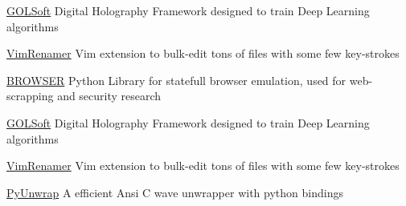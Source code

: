 \documentclass[11pt,a4paper]{moderncv}
\begin{document}

    \cventry{}                                                                         %
        {\href{https://github.com/pointtonull/golsoft}{GOLSoft}}                       %
        {Digital Holography Framework designed                                         %
         to train Deep Learning algorithms}                                            %
        {}{}{}                                                                         %

    \cventry{}                                                                         %
        {\href{https://github.com/pointtonull/vimrenamer}{VimRenamer}}                 %
        {Vim extension to bulk-edit tons of files with some few key-strokes}           %
        {}{}{}                                                                         %

    \cventry{}                                                                         %
        {\href{https://github.com/pointtonull/browser}{BROWSER}}                       %
        {Python Library for statefull browser emulation,                               %
         used for web-scrapping and security research}                                 %
        {}{}{}                                                                         %


    \cventry{}                                                                          %
        {\href{https://github.com/pointtonull/golsoft}{GOLSoft}}                        %
        {Digital Holography Framework designed                                          %
         to train Deep Learning algorithms}                                             %
        {}{}{}                                                                          %

    \cventry{}                                                                          %
        {\href{https://github.com/pointtonull/vimrenamer}{VimRenamer}}                  %
        {Vim extension to bulk-edit tons of files with some few key-strokes}            %
        {}{}{}                                                                          %

    \cventry{}                                                                          %
        {\href{https://github.com/pointtonull/pyunwrap}{PyUnwrap}}                      %
        {A efficient Ansi C wave unwrapper with python bindings}                        %
        {}{}{}                                                                          %
\end{document}
